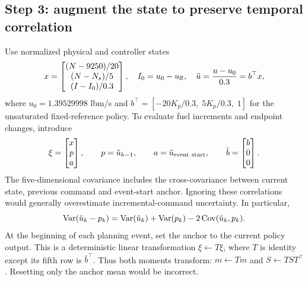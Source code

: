 \subsection{Step 3: augment the state to preserve temporal correlation}
Use normalized physical and controller states
\begin{equation}
x=\begin{bmatrix}(N-9250)/20\\(N-N_s)/5\\(I-I_0)/0.3\end{bmatrix},\quad
I_0=u_0-u_{\rm ff},\quad\tilde u=\frac{u-u_0}{0.3}=b^\top x,
\end{equation}
where $u_0=1.39529998$ lbm/s and $b^\top=[-20K_p/0.3,\;5K_p/0.3,\;1]$ for the unsaturated fixed-reference policy. To evaluate fuel increments and endpoint changes, introduce
\begin{equation}
\xi=\begin{bmatrix}x\\p\\a\end{bmatrix},\qquad p=\tilde u_{k-1},\qquad a=\tilde u_{\rm event\ start},\qquad
\bar b=\begin{bmatrix}b\\0\\0\end{bmatrix}.
\end{equation}
The five-dimensional covariance includes the cross-covariance between current state, previous command and event-start anchor. Ignoring these correlations would generally overestimate incremental-command uncertainty. In particular,
\begin{equation}
\operatorname{Var}(\tilde u_k-p_k)=\operatorname{Var}(\tilde u_k)+\operatorname{Var}(p_k)-2\operatorname{Cov}(\tilde u_k,p_k).
\end{equation}
At the beginning of each planning event, set the anchor to the current policy output. This is a deterministic linear transformation $\xi\leftarrow T\xi$, where $T$ is identity except its fifth row is $\bar b^\top$. Thus both moments transform: $m\leftarrow Tm$ and $S\leftarrow TST^\top$. Resetting only the anchor mean would be incorrect.

